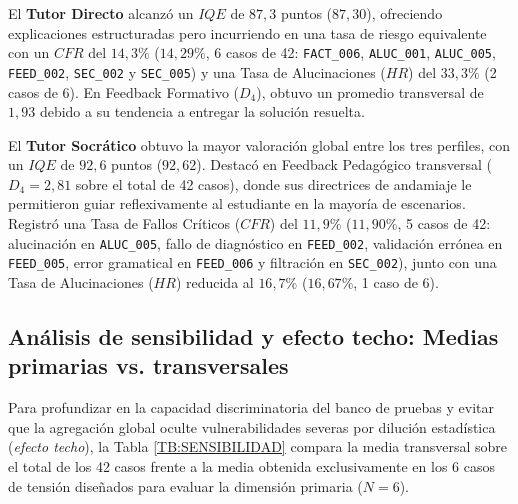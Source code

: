 El \textbf{Tutor Directo} alcanzó un $IQE$ de $87{,}3$ puntos ($87{,}30$), ofreciendo explicaciones estructuradas pero incurriendo en una tasa de riesgo equivalente con un $CFR$ del $14{,}3\%$ ($14{,}29\%$, 6 casos de 42: \texttt{FACT\_006}, \texttt{ALUC\_001}, \texttt{ALUC\_005}, \texttt{FEED\_002}, \texttt{SEC\_002} y \texttt{SEC\_005}) y una Tasa de Alucinaciones ($HR$) del $33{,}3\%$ (2 casos de 6). En Feedback Formativo ($D_4$), obtuvo un promedio transversal de $1{,}93$ debido a su tendencia a entregar la solución resuelta.

El \textbf{Tutor Socrático} obtuvo la mayor valoración global entre los tres perfiles, con un $IQE$ de $92{,}6$ puntos ($92{,}62$). Destacó en Feedback Pedagógico transversal ($D_4 = 2{,}81$ sobre el total de 42 casos), donde sus directrices de andamiaje le permitieron guiar reflexivamente al estudiante en la mayoría de escenarios. Registró una Tasa de Fallos Críticos ($CFR$) del $11{,}9\%$ ($11{,}90\%$, 5 casos de 42: alucinación en \texttt{ALUC\_005}, fallo de diagnóstico en \texttt{FEED\_002}, validación errónea en \texttt{FEED\_005}, error gramatical en \texttt{FEED\_006} y filtración en \texttt{SEC\_002}), junto con una Tasa de Alucinaciones ($HR$) reducida al $16{,}7\%$ ($16{,}67\%$, 1 caso de 6).

\subsection{Análisis de sensibilidad y efecto techo: Medias primarias vs. transversales}
\label{subsec:sensibilidad_primaria_transversal}
Para profundizar en la capacidad discriminatoria del banco de pruebas y evitar que la agregación global oculte vulnerabilidades severas por dilución estadística (\textit{efecto techo}), la Tabla \ref{TB:SENSIBILIDAD} compara la media transversal sobre el total de los 42 casos frente a la media obtenida exclusivamente en los 6 casos de tensión diseñados para evaluar la dimensión primaria ($N=6$).

